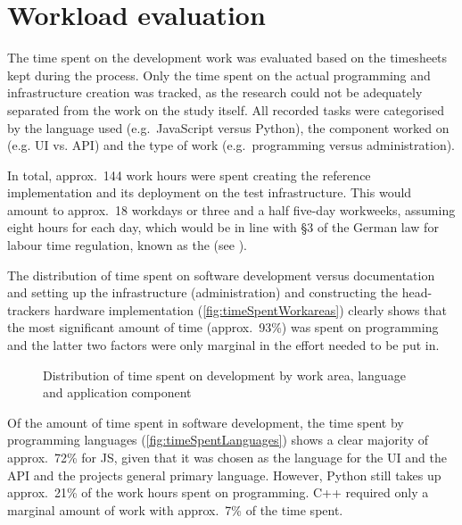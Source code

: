 \section{Workload evaluation}\label{sec:workload-evaluation}

The time spent on the development work was evaluated based on the timesheets kept during the process.
Only the time spent on the actual programming and infrastructure creation was tracked, as the research could not be adequately separated from the work on the study itself.
All recorded tasks were categorised by the language used (e.g.\ JavaScript versus Python), the component worked on (e.g. \ac{UI} vs. \ac{API}) and the type of work (e.g.\ programming versus administration).

In total, approx.~144 work hours were spent creating the reference implementation and its deployment on the test infrastructure.
This would amount to approx.~18 workdays or three and a half five-day workweeks, assuming eight hours for each day, which would be in line with §3 of the German law for labour time regulation, known as the  (see \parencite{abzgPar3}).

The distribution of time spent on software development versus documentation and setting up the infrastructure (administration) and constructing the head-tracker\textquotesingle s hardware implementation (\autoref{fig:timeSpentWorkareas}) clearly shows that the most significant amount of time (approx.~93\%) was spent on programming and the latter two factors were only marginal in the effort needed to be put in.

\begin{figure*}[!ht]
\centering

\caption[Distribution of time spent on development]{Distribution of time spent on development by work area, language and application component\protect}
\label{fig:timeSpentWorkareas}
\end{figure*}

Of the amount of time spent in software development, the time spent by programming languages (\autoref{fig:timeSpentLanguages}) shows a clear majority of approx.~72\% for \ac{JS}, given that it was chosen as the language for the \ac{UI} and the \ac{API} and the project\textquotesingle s general primary language.
However, Python still takes up approx.~21\% of the work hours spent on programming.
C++ required only a marginal amount of work with approx.~7\% of the time spent.

